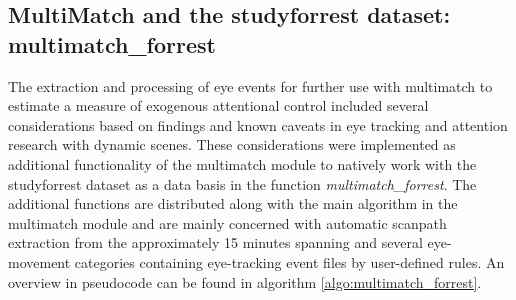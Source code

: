 \documentclass[a4paper, 11pt]{scrreprt}
\begin{document}
\subsection{MultiMatch and the studyforrest dataset: multimatch\_forrest}
The extraction and processing of eye events for further use with multimatch to estimate a measure of exogenous attentional control included several considerations based on findings and known caveats in eye tracking and attention research with dynamic scenes. These considerations were implemented as additional functionality of the multimatch module to natively work with the studyforrest dataset as a data basis in the function \textit{multimatch\_forrest}. The additional functions are distributed along with the main algorithm in the multimatch module and are mainly concerned with automatic scanpath extraction from the approximately 15 minutes spanning and several eye-movement categories containing eye-tracking event files by user-defined rules. An overview in pseudocode can be found in algorithm \ref{algo:multimatch_forrest}. \newline
\end{document}
